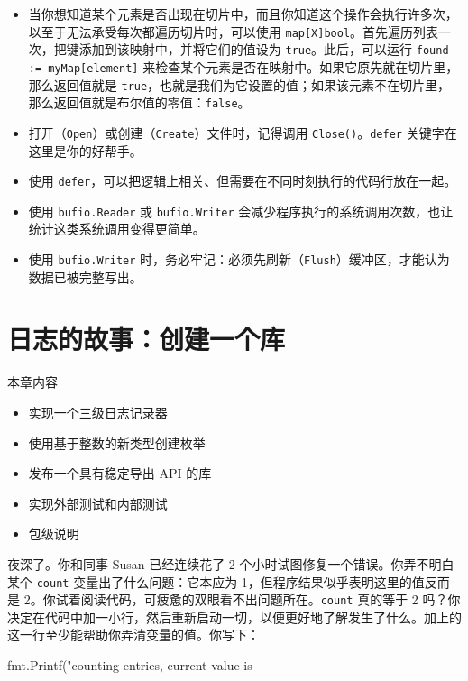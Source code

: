 \begin{itemize}
写下 \texttt{myMap[cd.Band] = struct\{\}\{\}}。循环结束时，映射的键就是原始列表中所有不重复的值。
\item 当你想知道某个元素是否出现在切片中，而且你知道这个操作会执行许多次，以至于无法承受每次都遍历切片时，可以使用 \texttt{map[X]bool}。首先遍历列表一次，把键添加到该映射中，并将它们的值设为 \texttt{true}。此后，可以运行 \texttt{found := myMap[element]} 来检查某个元素是否在映射中。如果它原先就在切片里，那么返回值就是 \texttt{true}，也就是我们为它设置的值；如果该元素不在切片里，那么返回值就是布尔值的零值：\texttt{false}。
\item 打开（\texttt{Open}）或创建（\texttt{Create}）文件时，记得调用 \texttt{Close()}。\texttt{defer} 关键字在这里是你的好帮手。
\item 使用 \texttt{defer}，可以把逻辑上相关、但需要在不同时刻执行的代码行放在一起。
\item 使用 \texttt{bufio.Reader} 或 \texttt{bufio.Writer} 会减少程序执行的系统调用次数，也让统计这类系统调用变得更简单。
\item 使用 \texttt{bufio.Writer} 时，务必牢记：必须先刷新（\texttt{Flush}）缓冲区，才能认为数据已被完整写出。
\end{itemize}

\chapter{日志的故事：创建一个库}

\begin{infobox}{本章内容}
\begin{itemize}
\item 实现一个三级日志记录器
\item 使用基于整数的新类型创建枚举
\item 发布一个具有稳定导出 API 的库
\item 实现外部测试和内部测试
\item 包级说明
\end{itemize}
\end{infobox}

夜深了。你和同事 Susan 已经连续花了 2 个小时试图修复一个错误。你弄不明白某个 \texttt{count} 变量出了什么问题：它本应为 1，但程序结果似乎表明这里的值反而是 2。你试着阅读代码，可疲惫的双眼看不出问题所在。\texttt{count} 真的等于 2 吗？你决定在代码中加一小行，然后重新启动一切，以便更好地了解发生了什么。加上的这一行至少能帮助你弄清变量的值。你写下：

\begin{gocode}[]
fmt.Printf("counting entries, current value is %
\end{gocode}

